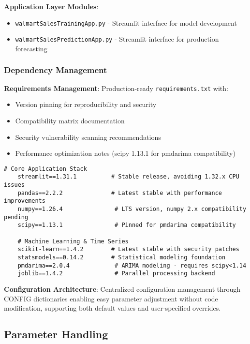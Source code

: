 \textbf{Application Layer Modules}:
\begin{itemize}
	\item \texttt{walmartSalesTrainingApp.py} - Streamlit interface for model development
	\item \texttt{walmartSalesPredictionApp.py} - Streamlit interface for production forecasting
\end{itemize}

\subsubsection{Dependency Management}

\textbf{Requirements Management}: Production-ready \texttt{requirements.txt} with:
\begin{itemize}
	\item Version pinning for reproducibility and security
	\item Compatibility matrix documentation
	\item Security vulnerability scanning recommendations
	\item Performance optimization notes (scipy 1.13.1 for pmdarima compatibility)
\end{itemize}

\begin{lstlisting}[language=MyPython, caption={Requirements Configuration Example}]
	# Core Application Stack
	streamlit==1.31.1          # Stable release, avoiding 1.32.x CPU issues
	pandas==2.2.2              # Latest stable with performance improvements
	numpy==1.26.4               # LTS version, numpy 2.x compatibility pending
	scipy==1.13.1               # Pinned for pmdarima compatibility
	
	# Machine Learning & Time Series
	scikit-learn==1.4.2        # Latest stable with security patches
	statsmodels==0.14.2        # Statistical modeling foundation
	pmdarima==2.0.4             # ARIMA modeling - requires scipy<1.14
	joblib==1.4.2               # Parallel processing backend
\end{lstlisting}

\textbf{Configuration Architecture}: Centralized configuration management through CONFIG dictionaries enabling easy parameter adjustment without code modification, supporting both default values and user-specified overrides.

\subsection{Parameter Handling}

